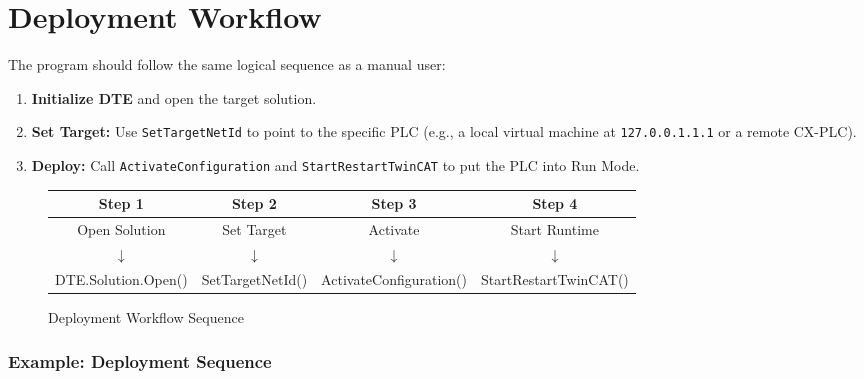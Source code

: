 \documentclass[11pt,a4paper]{article}
\begin{document}
\section{Deployment Workflow}

The program should follow the same logical sequence as a manual user:

\begin{enumerate}[leftmargin=*]
    \item \textbf{Initialize DTE} and open the target solution.
    \item \textbf{Set Target:} Use \texttt{SetTargetNetId} to point to the specific PLC (e.g., a local virtual machine at \texttt{127.0.0.1.1.1} or a remote CX-PLC).
    \item \textbf{Deploy:} Call \texttt{ActivateConfiguration} and \texttt{StartRestartTwinCAT} to put the PLC into Run Mode.
\end{enumerate}

\begin{figure}[h]
\centering
\begin{tabular}{|c|c|c|c|}
\hline
\textbf{Step 1} & \textbf{Step 2} & \textbf{Step 3} & \textbf{Step 4} \\
\hline
Open Solution & Set Target & Activate & Start Runtime \\
$\downarrow$ & $\downarrow$ & $\downarrow$ & $\downarrow$ \\
DTE.Solution.Open() & SetTargetNetId() & ActivateConfiguration() & StartRestartTwinCAT() \\
\hline
\end{tabular}
\caption{Deployment Workflow Sequence}
\end{figure}

\subsubsection*{Example: Deployment Sequence}
\end{document}
